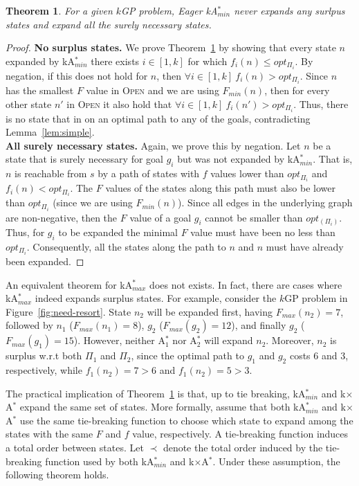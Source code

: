 \documentclass{aicom2e}
\newtheorem{theorem}{Theorem}
\newcommand{\kgs}{$k$GP}
\newcommand{\kastarmin}{kA$^*_{min}$}
\newcommand{\kastarmax}{kA$^*_{max}$}
\newcommand{\kxastar}{k$\times$A$^*$}
\newcommand{\astari}[1]{A$^*_#1$}
\newcommand{\minf}{$F_{min}(n)$}
\newcommand{\open}{\textsc{Open}}
\begin{document}
\begin{theorem}
    For a given \kgs{} problem, Eager \kastarmin{} never expands any surlpus states and
    expand all the surely necessary states.
    \label{the:kastarmin-effective}
\end{theorem}
\begin{proof}
{\bf No surplus states.}    We prove Theorem~\ref{the:kastarmin-effective} by showing that every state $n$
    expanded by \kastarmin{} there exists $i\in [1,k]$ for which $f_i(n)\leq opt_{\Pi_i}$.
    By negation, if this does not hold for $n$, then $\forall i\in[1,k]~f_i(n)>opt_{\Pi_i}$.
    Since $n$ has the smallest $F$ value in \open{} and we are using \minf{}, then
    for every other state $n'$ in \open{} it also hold that $\forall i\in[1,k]~f_i(n')>opt_{\Pi_i}$.
    Thus, there is no state that in on an optimal path to any of the goals, contradicting Lemma~\ref{lem:simple}. \\

    {\bf All surely necessary states.} Again, we prove this by negation. Let $n$ be a state
    that is surely necessary for goal $g_i$ but was not expanded by \kastarmin{}.
    That is, $n$ is reachable from $s$ by a path of states with $f$ values lower than $opt_{\Pi_i}$
    and $f_i(n)<opt_{\Pi_i}$. The $F$ values of the states along this path must also be lower than $opt_{\Pi_i}$ (since we are using \minf). Since all edges in the underlying graph are non-negative, then the $F$ value of a goal $g_i$ cannot be smaller than $opt_(\Pi_i)$. Thus, for $g_i$ to be expanded the minimal $F$ value must have been no less than $opt_{\Pi_i}$. Consequently, all the states along the path to $n$ and $n$ must have already been expanded.
\end{proof}
An equivalent theorem for \kastarmax{} does not exists. In fact, there are cases where \kastarmax{} indeed expands surplus states. For example, consider the \kgs{} problem in Figure~\ref{fig:need-resort}. 
State $n_2$ will be expanded first, having $F_{max}(n_2)=7$, followed by $n_1$ ($F_{max}(n_1)=8$), 
$g_2$ ($F_{max}(g_2)=12$), and finally $g_2$ ($F_{max}(g_1)=15$). However, neither \astari{1} nor \astari{2} will expand $n_2$. Moreover, $n_2$ is surplus w.r.t both $\Pi_1$ and $\Pi_2$, 
since the optimal path to $g_1$ and $g_2$ costs 6 and 3, respectively, while $f_1(n_2)=7>6$ and $f_1(n_2)=5>3$. 


The practical implication of Theorem~\ref{the:kastarmin-effective} is that, up to tie breaking,
\kastarmin{} and \kxastar{} expand the same set of states. More formally, 
assume that both \kastarmin{} and \kxastar{} use the same tie-breaking function 
to choose which state to expand among the states with the same $F$ and $f$ value, respectively. 
A tie-breaking function induces a total order between states. Let $\prec$ denote 
the total order induced by the tie-breaking function used by both \kastarmin{} and \kxastar{}. 
Under these assumption, the following theorem holds. 
\end{document}
